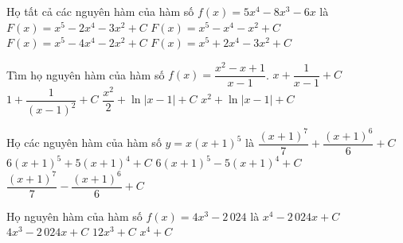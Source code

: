 \begin{ex}%
	Họ tất cả các nguyên hàm của hàm số $f(x)=5x^4-8x^3-6x$ là 
	 \choice
		{\True  $F(x)=x^5-2x^4-3x^2+C$}
		{$F(x)=x^5-x^4-x^2+C$} 
		{$F(x)=x^5-4x^4-2x^2+C$} 
		{$F(x)=x^5+2x^4-3x^2+C$} 
\end{ex}

\begin{ex}%
	Tìm họ nguyên hàm  của hàm số $f(x)=\dfrac{x^2-x+1}{x-1}$.
	 \choice
		{$x+\dfrac{1}{x-1}+C$} 
		 {$1+\dfrac{1}{(x-1)^2}+C$}
		{\True  $\dfrac{x^2}{2}+\ln|x-1|+C$}
		{$x^2+\ln|x-1|+C$} 
\end{ex}

\begin{ex}%
	Họ các nguyên hàm của  hàm số $y=x(x+1)^5$ là
	 \choice
		{$\dfrac{(x+1)^7}{7}+\dfrac{(x+1)^6}{6}+C$} 
		 {$6(x+1)^5+5(x+1)^4+C$}
		{$6(x+1)^5-5(x+1)^4+C$} 
		{\True $\dfrac{(x+1)^7}{7}-\dfrac{(x+1)^6}{6}+C$} 
\end{ex}

\begin{ex}%
	Họ nguyên hàm của hàm  số $f(x)=4x^3-2\,024$ là
	 \choice
		{\True  $x^4-2\,024x+C$}
		 {$4x^3-2\,024x+C$}
		{$12x^3+C$} 
		{$x^4+C$} 
\end{ex}

